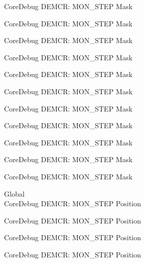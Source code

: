 \begin{DoxyRefList}
\label{deprecated__deprecated000194}%
%
Core\+Debug DEMCR\+: MON\+\_\+\+STEP Mask 

\label{deprecated__deprecated000336}%
%
Core\+Debug DEMCR\+: MON\+\_\+\+STEP Mask 

\label{deprecated__deprecated000412}%
%
Core\+Debug DEMCR\+: MON\+\_\+\+STEP Mask 

\label{deprecated__deprecated000501}%
%
Core\+Debug DEMCR\+: MON\+\_\+\+STEP Mask 

\label{deprecated__deprecated000603}%
%
Core\+Debug DEMCR\+: MON\+\_\+\+STEP Mask 

\label{deprecated__deprecated000728}%
%
Core\+Debug DEMCR\+: MON\+\_\+\+STEP Mask 

\label{deprecated__deprecated000872}%
%
Core\+Debug DEMCR\+: MON\+\_\+\+STEP Mask 

\label{deprecated__deprecated001014}%
%
Core\+Debug DEMCR\+: MON\+\_\+\+STEP Mask 

\label{deprecated__deprecated001090}%
%
Core\+Debug DEMCR\+: MON\+\_\+\+STEP Mask 

\label{deprecated__deprecated001179}%
%
Core\+Debug DEMCR\+: MON\+\_\+\+STEP Mask 

\label{deprecated__deprecated001281}%
%
Core\+Debug DEMCR\+: MON\+\_\+\+STEP Mask  
\item[Global \doxylink{group___c_m_s_i_s___core_debug_ga9ae10710684e14a1a534e785ef390e1b}{Core\+Debug\+\_\+\+DEMCR\+\_\+\+MON\+\_\+\+STEP\+\_\+\+Pos} ]\hfill \\
\label{deprecated__deprecated000049}%
%
Core\+Debug DEMCR\+: MON\+\_\+\+STEP Position 

\label{deprecated__deprecated000193}%
%
Core\+Debug DEMCR\+: MON\+\_\+\+STEP Position 

\label{deprecated__deprecated000335}%
%
Core\+Debug DEMCR\+: MON\+\_\+\+STEP Position 

\label{deprecated__deprecated000411}%
%
Core\+Debug DEMCR\+: MON\+\_\+\+STEP Position 


\end{DoxyRefList}
